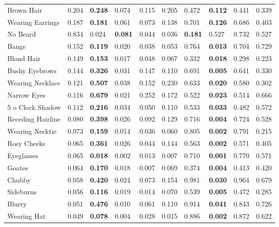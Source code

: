 \begin{tabular}{lrllrrllrr}
 Brown Hair          & 0.204 & \bf 0.248 & 0.074     & 0.115 & 0.205 & 0.472     & \bf 0.112 & 0.441 & 0.339 \\
 Wearing Earrings    & 0.187 & \bf 0.181 & 0.061     & 0.073 & 0.138 & 0.701     & \bf 0.126 & 0.686 & 0.403 \\
 No Beard            & 0.834 & 0.024     & \bf 0.081 & 0.044 & 0.036 & \bf 0.181 & 0.527     & 0.732 & 0.527 \\
 Bangs               & 0.152 & \bf 0.119 & 0.020     & 0.038 & 0.053 & 0.764     & \bf 0.013 & 0.704 & 0.729 \\
 Blond Hair          & 0.149 & \bf 0.153 & 0.017     & 0.048 & 0.067 & 0.332     & \bf 0.018 & 0.298 & 0.223 \\
 Bushy Eyebrows      & 0.144 & \bf 0.326 & 0.031     & 0.147 & 0.110 & 0.691     & \bf 0.005 & 0.641 & 0.330 \\
 Wearing Necklace    & 0.121 & \bf 0.507 & 0.038     & 0.152 & 0.230 & 0.633     & \bf 0.020 & 0.580 & 0.302 \\
 Narrow Eyes         & 0.116 & \bf 0.679 & 0.021     & 0.252 & 0.172 & 0.522     & \bf 0.023 & 0.514 & 0.666 \\
 5 o Clock Shadow    & 0.112 & \bf 0.216 & 0.034     & 0.050 & 0.110 & 0.533     & \bf 0.033 & 0.482 & 0.572 \\
 Receding Hairline   & 0.080 & \bf 0.398 & 0.026     & 0.092 & 0.129 & 0.716     & \bf 0.004 & 0.724 & 0.528 \\
 Wearing Necktie     & 0.073 & \bf 0.159 & 0.014     & 0.036 & 0.060 & 0.805     & \bf 0.002 & 0.791 & 0.215 \\
 Rosy Cheeks         & 0.065 & \bf 0.361 & 0.026     & 0.044 & 0.144 & 0.563     & \bf 0.002 & 0.571 & 0.405 \\
 Eyeglasses          & 0.065 & \bf 0.018 & 0.002     & 0.013 & 0.007 & 0.710     & \bf 0.001 & 0.770 & 0.571 \\
 Goatee              & 0.064 & \bf 0.170 & 0.018     & 0.007 & 0.069 & 0.374     & \bf 0.004 & 0.413 & 0.420 \\
 Chubby              & 0.058 & \bf 0.420 & 0.024     & 0.073 & 0.154 & 0.981     & \bf 0.030 & 0.964 & 0.679 \\
 Sideburns           & 0.056 & \bf 0.116 & 0.019     & 0.014 & 0.070 & 0.539     & \bf 0.005 & 0.472 & 0.285 \\
 Blurry              & 0.051 & \bf 0.476 & 0.010     & 0.061 & 0.110 & 0.914     & \bf 0.041 & 0.843 & 0.726 \\
 Wearing Hat         & 0.049 & \bf 0.078 & 0.004     & 0.028 & 0.015 & 0.886     & \bf 0.002 & 0.872 & 0.622 \\

\end{tabular}
